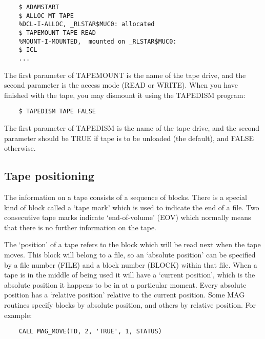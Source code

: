 \begin{small}
\begin{verbatim}
    $ ADAMSTART
    $ ALLOC MT TAPE
    %DCL-I-ALLOC, _RLSTAR$MUC0: allocated
    $ TAPEMOUNT TAPE READ
    %MOUNT-I-MOUNTED,  mounted on _RLSTAR$MUC0:
    $ ICL
    ...
\end{verbatim}
\end{small}

The first parameter of TAPEMOUNT is the name of the tape drive, and the second
parameter is the access mode (READ or WRITE).
When you have finished with the tape, you may dismount it using the TAPEDISM
program:

\begin{small}
\begin{verbatim}
    $ TAPEDISM TAPE FALSE
\end{verbatim}
\end{small}

The first parameter of TAPEDISM is the name of the tape drive, and the second
parameter should be TRUE if tape is to be unloaded (the default), and FALSE
otherwise.

\subsection{Tape positioning}

The information on a tape consists of a sequence of blocks.
There is a special kind of block called a `tape mark' which is used to
indicate the end of a file.
Two consecutive tape marks indicate `end-of-volume' (EOV) which normally
means that there is no further information on the tape.

The `position' of a tape refers to the block which will be read next when
the tape moves.
This block will belong to a file, so an `absolute position' can be
specified by a file number (FILE) and a block number (BLOCK) within that file.
When a tape is in the middle of being used it will have a `current position',
which is the absolute position it happens to be in at a particular moment.
Every absolute position has a `relative position' relative to the current
position.
Some MAG routines specify blocks by absolute position, and others by relative
position.
For example:

\begin{small}
\begin{verbatim}
    CALL MAG_MOVE(TD, 2, 'TRUE', 1, STATUS)
\end{verbatim}
\end{small}

